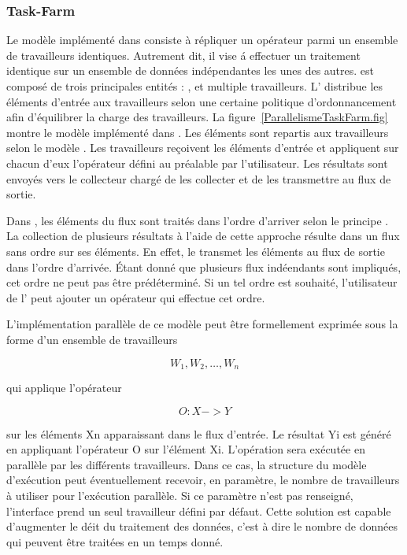\subsubsection{Task-Farm}

Le mod\`ele  impl\'ement\'e dans   consiste \`a r\'epliquer un op\'erateur parmi un ensemble de travailleurs identiques. Autrement dit, il vise \'a effectuer un traitement identique sur un ensemble de donn\'ees ind\'ependantes les unes des autres.  est compos\'e de trois principales entit\'es : ,  et multiple travailleurs. L' distribue les \'el\'ements d'entr\'ee aux travailleurs selon une certaine politique d'ordonnancement afin d'\'equilibrer la charge des travailleurs. La figure~\ref{ParallelismeTaskFarm.fig} montre le mod\`ele  impl\'ement\'e dans . Les \'el\'ements sont repartis aux travailleurs selon le mod\`ele . Les travailleurs re\c coivent les \'el\'ements d'entr\'ee et appliquent sur chacun d'eux l'op\'erateur d\'efini au pr\'ealable par l'utilisateur. Les r\'esultats sont envoy\'es vers le collecteur charg\'e de les collecter et de les transmettre au flux de sortie.

Dans , les \'el\'ements du flux sont trait\'es dans l'ordre d'arriver selon le principe . La collection de plusieurs r\'esultats \`a l'aide de cette approche r\'esulte dans un flux sans ordre sur ses \'el\'ements. En effet, le  transmet les \'el\'ements au flux de sortie dans l'ordre d'arriv\'ee. \'Etant donn\'e que plusieurs flux ind\'eendants sont impliqu\'es, cet ordre ne peut pas \^etre pr\'ed\'etermin\'e. Si un tel ordre est souhait\'e, l'utilisateur de l' peut  ajouter un op\'erateur qui effectue cet ordre.

L'impl\'ementation parall\`ele de ce mod\`ele peut \^etre formellement exprim\'ee sous la forme d'un ensemble de travailleurs 

\[
	{W_1, W_2,\ldots, W_n}
\]

qui applique l'op\'erateur 

\[
	O : X -> Y
\]

sur les \'el\'ements Xn apparaissant dans le flux d'entr\'ee. Le r\'esultat Yi est g\'en\'er\'e en appliquant l'op\'erateur O sur l'\'el\'ement Xi. L'op\'eration sera ex\'ecut\'ee en parall\`ele par les diff\'erents travailleurs. Dans ce cas, la structure du mod\`ele d'ex\'ecution peut \'eventuellement recevoir, en param\`etre, le nombre de travailleurs \`a utiliser pour l'ex\'ecution parall\`ele. Si ce param\`etre n'est pas renseign\'e, l'interface prend un seul travailleur d\'efini par d\'efaut. Cette solution est capable d'augmenter le d\'eit du traitement des donn\'ees, c'est \`a dire le nombre de donn\'ees qui peuvent \^etre trait\'ees en un temps donn\'e.

